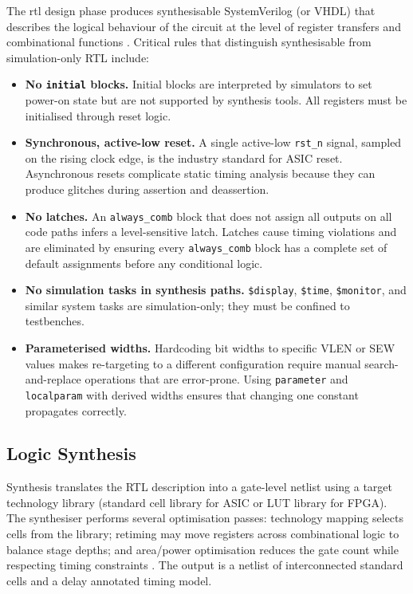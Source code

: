 The \gls{rtl} design phase produces synthesisable SystemVerilog (or VHDL) that
describes the logical behaviour of the circuit at the level of register transfers and
combinational functions \cite{harris2012digital, weste2010cmos}. Critical rules that
distinguish synthesisable from simulation-only RTL include:

\begin{itemize}
  \item \textbf{No \texttt{initial} blocks.} Initial blocks are interpreted by
        simulators to set power-on state but are not supported by synthesis tools.
        All registers must be initialised through reset logic.
  \item \textbf{Synchronous, active-low reset.} A single active-low \texttt{rst\_n}
        signal, sampled on the rising clock edge, is the industry standard for ASIC
        reset. Asynchronous resets complicate static timing analysis because they
        can produce glitches during assertion and deassertion.
  \item \textbf{No latches.} An \texttt{always\_comb} block that does not assign
        all outputs on all code paths infers a level-sensitive latch. Latches cause
        timing violations and are eliminated by ensuring every \texttt{always\_comb}
        block has a complete set of default assignments before any conditional logic.
  \item \textbf{No simulation tasks in synthesis paths.} \texttt{\$display},
        \texttt{\$time}, \texttt{\$monitor}, and similar system tasks are
        simulation-only; they must be confined to testbenches.
  \item \textbf{Parameterised widths.} Hardcoding bit widths to specific VLEN or
        SEW values makes re-targeting to a different configuration require manual
        search-and-replace operations that are error-prone. Using \texttt{parameter}
        and \texttt{localparam} with derived widths ensures that changing one constant
        propagates correctly.
\end{itemize}

\subsection{Logic Synthesis}

Synthesis translates the RTL description into a gate-level netlist using a target
technology library (standard cell library for ASIC or LUT library for FPGA). The
synthesiser performs several optimisation passes: technology mapping selects cells from
the library; retiming may move registers across combinational logic to balance stage
depths; and area/power optimisation reduces the gate count while respecting timing
constraints \cite{weste2010cmos}. The output is a netlist of interconnected standard
cells and a delay annotated timing model.

